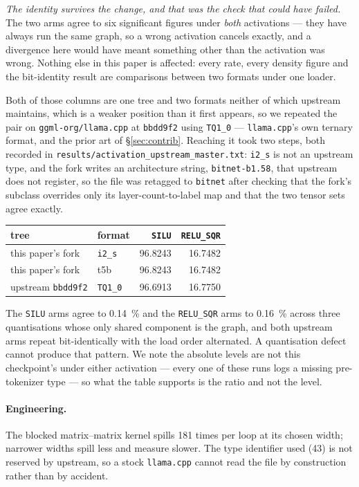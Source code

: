 \documentclass[11pt,a4paper]{article}
\newcommand{\code}[1]{\texttt{#1}}
\begin{document}
\emph{The identity survives the change, and that was the check that could have
failed.} The two arms agree to six significant figures under \emph{both}
activations --- they have always run the same graph, so a wrong activation
cancels exactly, and a divergence here would have meant something other than the
activation was wrong. Nothing else in this paper is affected: every rate, every
density figure and the bit-identity result are comparisons between two formats
under one loader.

Both of those columns are one tree and two formats neither of which upstream
maintains, which is a weaker position than it first appears, so we repeated the
pair on \code{ggml-org/llama.cpp} at \code{bbdd9f2} using \code{TQ1\_0} ---
\code{llama.cpp}'s own ternary format, and the prior art of \S\ref{sec:contrib}.
Reaching it took two steps, both recorded in
\code{results/activation\_upstream\_master.txt}: \code{i2\_s} is not an upstream
type, and the fork writes an architecture string, \code{bitnet-b1.58}, that
upstream does not register, so the file was retagged to \code{bitnet} after
checking that the fork's subclass overrides only its layer-count-to-label map
and that the two tensor sets agree exactly.
\begin{center}
\begin{tabular}{llrr}
\toprule
tree & format & \code{SILU} & \code{RELU\_SQR} \\
\midrule
this paper's fork   & \code{i2\_s} & \num{96.8243} & \num{16.7482} \\
this paper's fork   & t5b          & \num{96.8243} & \num{16.7482} \\
upstream \code{bbdd9f2} & \code{TQ1\_0} & \num{96.6913} & \num{16.7750} \\
\bottomrule
\end{tabular}
\end{center}
The \code{SILU} arms agree to \SI{0.14}{\percent} and the \code{RELU\_SQR} arms
to \SI{0.16}{\percent} across three quantisations whose only shared component is
the graph, and both upstream arms repeat bit-identically with the load order
alternated. A quantisation defect cannot produce that pattern. We note the
absolute levels are not this checkpoint's under either activation --- every one
of these runs logs a missing pre-tokenizer type --- so what the table supports is
the ratio and not the level.

\paragraph{Engineering.} The blocked matrix--matrix kernel spills 181 times per
loop at its chosen width; narrower widths spill less and measure slower. The
type identifier used (43) is not reserved by upstream, so a stock
\code{llama.cpp} cannot read the file by construction rather than by accident.
\end{document}
